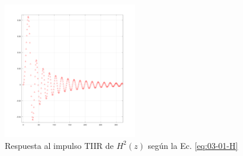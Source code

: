     \begin{figure}
      \centering
      \includegraphics[width=0.52\textwidth]{../images/03-01-untruncated-ellip.png}
      \caption{Respuesta al impulso TIIR de $H^{2}(z)$ según la Ec. \ref{eq:03-01-H}}
      \label{fig:03-00-hfir+}
    \end{figure}

